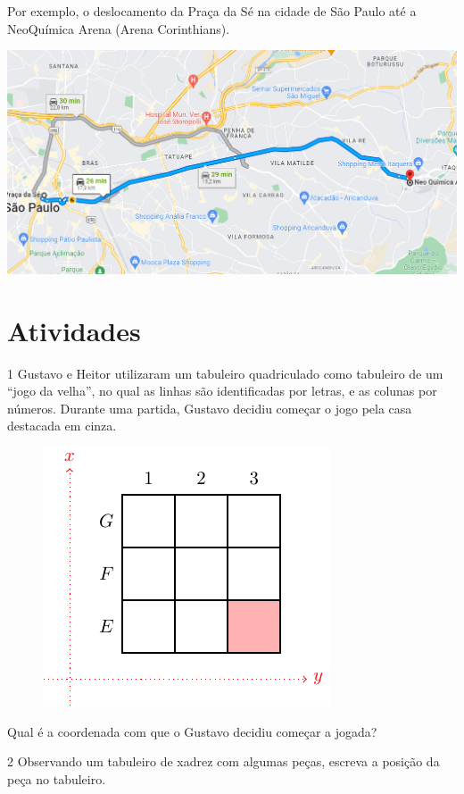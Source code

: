 {Por exemplo, o deslocamento da Praça da Sé na cidade de São Paulo até a
NeoQuímica Arena (Arena Corinthians).

\includegraphics[width=\textwidth]{./_SAEB_9_MAT/media/image196.png}


}

\section*{Atividades}

\num{1} Gustavo e Heitor utilizaram um tabuleiro quadriculado como tabuleiro
de um ``jogo da velha'', no qual as linhas são identificadas por letras,
e as colunas por números. Durante uma partida, Gustavo decidiu começar
o jogo pela casa destacada em cinza.

\begin{figure}[htpb!]
\centering
\includegraphics[width=.29\textwidth]{./tikz/029.pdf}
\end{figure}

Qual é a coordenada com que o Gustavo decidiu começar a jogada?


\num{2} Observando um tabuleiro de xadrez com algumas peças, escreva a posição
da peça no tabuleiro.

